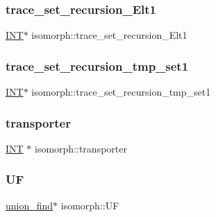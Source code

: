 \subsubsection{\texorpdfstring{trace\+\_\+set\+\_\+recursion\+\_\+\+Elt1}{trace\_set\_recursion\_Elt1}}
{\footnotesize\ttfamily \mbox{\hyperlink{galois_8h_a09fddde158a3a20bd2dcadb609de11dc}{I\+NT}}$\ast$ isomorph\+::trace\+\_\+set\+\_\+recursion\+\_\+\+Elt1}

\mbox{\label{classisomorph_acb6f67adb51e5b7c70b251e4c9dac2eb}} 
\subsubsection{\texorpdfstring{trace\+\_\+set\+\_\+recursion\+\_\+tmp\+\_\+set1}{trace\_set\_recursion\_tmp\_set1}}
{\footnotesize\ttfamily \mbox{\hyperlink{galois_8h_a09fddde158a3a20bd2dcadb609de11dc}{I\+NT}}$\ast$ isomorph\+::trace\+\_\+set\+\_\+recursion\+\_\+tmp\+\_\+set1}

\mbox{\label{classisomorph_ad835b4f9fdd2cc4f486ff10972f43758}} 
\subsubsection{\texorpdfstring{transporter}{transporter}}
{\footnotesize\ttfamily \mbox{\hyperlink{galois_8h_a09fddde158a3a20bd2dcadb609de11dc}{I\+NT}} $\ast$ isomorph\+::transporter}

\mbox{\label{classisomorph_a963cf2760b76969c2439a83250847495}} 
\subsubsection{\texorpdfstring{UF}{UF}}
{\footnotesize\ttfamily \mbox{\hyperlink{classunion__find}{union\+\_\+find}}$\ast$ isomorph\+::\+UF}

\mbox{\label{classisomorph_a8e256da8cb2bb103de34151550b519e2}} 
